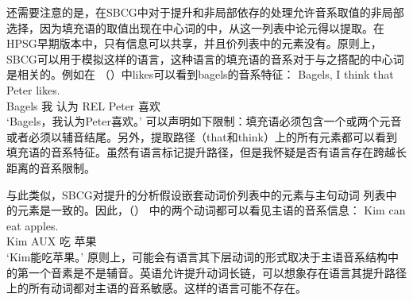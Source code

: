 还需要注意的是，在SBCG中对于提升和非局部依存的处理允许音系取值的非局部选择，因为填充语的\formvc 取值出现在中心词的\argstlc 中，从这一列表中论元得以提取。在HPSG早期版本中，只有\localc 信息可以共享，并且价列表中的元素没有\phonfc。原则上，SBCG可以用于模拟这样的语言，这种语言的填充语的音系对于与之搭配的中心词是相关的。例如在 （）中likes可以看到bagels的音系特征：
\ea
\gll Bagels, I think that Peter likes.\\
     Bagels 我 认为 REL Peter 喜欢\\
\glt `Bagels，我认为Peter喜欢。'
\z
可以声明如下限制：填充语必须包含一个或两个元音或者必须以辅音结尾。另外，提取路径（that和think）上的所有元素都可以看到填充语的音系特征。虽然有语言标记提升路径，但是我怀疑是否有语言存在跨越长距离的音系限制。

与此类似，SBCG对提升的分析假设嵌套动词价列表中的元素与主句动词 \argstlc 列表中的元素是一致的\citep[]{Sag2012a}。因此，（） 中的两个动词都可以看见主语的音系信息：
\ea
\gll Kim can eat apples.\\
     Kim AUX 吃 苹果\\
\glt `Kim能吃苹果。'
\z
原则上，可能会有语言其下层动词的形式取决于主语音系结构中的第一个音素是不是辅音。英语允许提升动词长链，可以想象存在语言其提升路径上的所有动词都对主语的音系敏感。这样的语言可能不存在。


